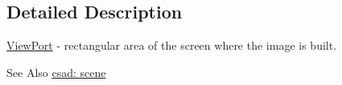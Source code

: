 \subsection{Detailed Description}
\hyperlink{classcsad_1_1_view_port}{View\-Port} -\/ rectangular area of the screen where the image is built. 

\begin{DoxySeeAlso}{See Also}
\hyperlink{group__scene}{csad\-: scene} 
\end{DoxySeeAlso}
